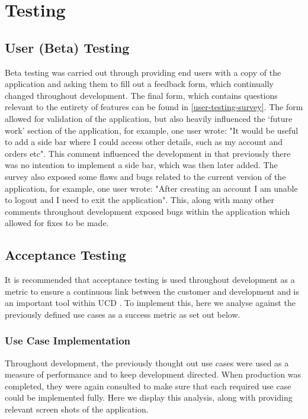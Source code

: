 \documentclass[12pt]{article}
\begin{document}
	
	\section{Testing}
	
	
	\label{use-case-implementation}
	\subsection{User (Beta) Testing}
	Beta testing was carried out through providing end users with a copy of the application and asking them to fill out a feedback form, which continually changed throughout development. The final form, which contains questions relevant to the entirety of features can be found in \autoref{user-testing-survey}.
	The form allowed for validation of the application, but also heavily influenced the ‘future work’ section of the application, for example, one user wrote:
	"It would be useful to add a side bar where I could access other details, such as my account and orders etc". This comment influenced the development in that previously there was no intention to implement a side bar, which was then later added.
	The survey also exposed some flaws and bugs related to the current version of the application, for example, one user wrote:
	"After creating an account I am unable to logout and I need to exit the application". This, along with many other comments throughout development exposed bugs within the application which allowed for fixes to be made.
	
	\subsection{Acceptance Testing}
	
	It is recommended that acceptance testing is used throughout development as a metric to ensure a continuous link between the customer and development and is an important tool within UCD \cite{humbleContinuousDeliveryReliable2010}. To implement this, here we analyse against the previously defined use cases as a success metric as set out below.
	
	\subsubsection{Use Case Implementation}
	Throughout development, the previously thought out use cases were used as a measure of performance and to keep development directed. When production was completed, they were again consulted to make sure that each required use case could be implemented fully. Here we display this analysis, along with providing relevant screen shots of the application.
	\newline
	
\end{document}
